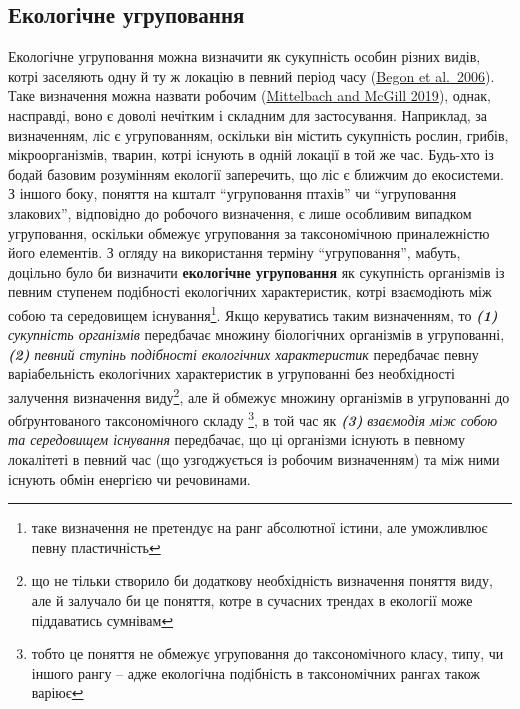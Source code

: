\documentclass[
  11pt,
]{book}
\begin{document}
\subsection{Екологічне угруповання}\label{community-def}

Екологічне угруповання можна визначити як сукупність особин різних видів, котрі заселяють одну й ту ж локацію в певний період часу (\href{https://scholar.google.com/scholar_lookup?title=Ecology\%3A\%20From\%20Individuals\%20to\%20Ecosystems&author=\%20&author=\%20&author=\%20&publication_year=2006&book=Ecology\%3A\%20From\%20Individuals\%20to\%20Ecosystems}{Begon et al.~2006}). Таке визначення можна назвати робочим (\href{https://doi.org/10.1093/oso/9780198835851.001.0001}{Mittelbach and McGill 2019}), однак, насправді, воно є доволі нечітким і складним для застосування. Наприклад, за визначенням, ліс є угрупованням, оскільки він містить сукупність рослин, грибів, мікроорганізмів, тварин, котрі існують в одній локації в той же час. Будь-хто із бодай базовим розумінням екології заперечить, що ліс є ближчим до екосистеми. З іншого боку, поняття на кшталт ``угруповання птахів'' чи ``угруповання злакових'', відповідно до робочого визначення, є лише особливим випадком угруповання, оскільки обмежує угруповання за таксономічною приналежністю його елементів. З огляду на використання терміну ``угруповання'', мабуть, доцільно було би визначити \textbf{екологічне угруповання} як сукупність організмів із певним ступенем подібності екологічних характеристик, котрі взаємодіють між собою та середовищем існування\footnote{таке визначення не претендує на ранг абсолютної істини, але уможливлює певну пластичність}. Якщо керуватись таким визначенням, то \textbf{\emph{(1)}} \emph{сукупність організмів} передбачає множину біологічних організмів в угрупованні, \textbf{\emph{(2)}} \emph{певний ступінь подібності екологічних характеристик} передбачає певну варіабельність екологічних характеристик в угрупованні без необхідності залучення визначення виду\footnote{що не тільки створило би додаткову необхідність визначення поняття виду, але й залучало би це поняття, котре в сучасних трендах в екології може піддаватись сумнівам}, але й обмежує множину організмів в угрупованні до обґрунтованого таксономічного складу \footnote{тобто це поняття не обмежує угруповання до таксономічного класу, типу, чи іншого рангу -- адже екологічна подібність в таксономічних рангах також варіює}, в той час як \textbf{\emph{(3)}} \emph{взаємодія між собою та середовищем існування} передбачає, що ці організми існують в певному локалітеті в певний час (що узгоджується із робочим визначенням) та між ними існують обмін енергією чи речовинами.
\end{document}
